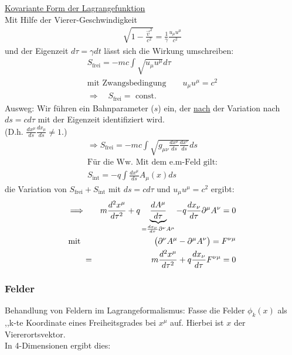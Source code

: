 \underline{Kovariante Form der Lagrangefunktion}\\
Mit Hilfe der Vierer-Geschwindigkeit 
\begin{eqnarray*}
\sqrt{1 - \frac{\vec v^ 2}{c^ 2}} = \frac 1 { \gamma} \frac{u_{\mu} u^ {\mu}}{c^2}
\end{eqnarray*}
und der Eigenzeit $d\tau = \gamma dt$ lässt sich die Wirkung umschreiben:
\begin{eqnarray*}
S_{\text {frei}} = -mc \int \sqrt{u_{\mu}u^ {\mu }} d\tau\\
\text{mit Zwangsbedingung}\qquad u_{\mu}u^ {\mu} = c^ 2\\
\Longrightarrow \quad S_{\text{frei}} = \text{ const.}
\end{eqnarray*}
Ausweg: \babsatz  Wir führen ein Bahnparameter ($s$) ein, der \underline{nach} der Variation nach $ds = cd\tau$ mit der Eigenzeit identifiziert wird.\\
(D.h. $ \frac{dx^ {\mu}}{ds}\frac {dx_{\mu} }{ds} \neq 1$.)\eabsatz
\begin{eqnarray*}
\Longrightarrow S_{\text{frei}} = -mc \int \sqrt{g_{\mu\nu}\frac{dx^ {\mu}}{ds} \frac{dx^{\nu} }{ds} }ds\\
\text{Für die Ww. Mit dem e.m-Feld gilt:}\\
S_{\text{int}} = - q \int \frac{dx^ {\mu}}{ds} A_{\mu}(x) ds
\end{eqnarray*}
die Variation von $S_{\text{frei}} + S_{\text{int}}$ mit $ds = cd\tau$ und $u_{\mu}u^ {\mu} = c^ 2$ ergibt:
\begin{eqnarray*}
\Longrightarrow&{}& m \frac{d^ 2x^ {\mu}}{d\tau^ 2} + q
\underbrace{\frac{dA^ {\mu}}{d\tau}}_{=
  \frac{dx_{\nu}}{d\tau}\partial^ {\nu}A^ {\mu}} - q\frac{dx_{\nu}}{d\tau} \partial^ {\mu} A^ {\nu} = 0\\ 
\text{mit }&{}& \quad \big ( \partial^  {\nu}A^ {\mu} - \partial^ {\mu}A^ {\nu}\big ) = F^ {\nu\mu}\\
&=& m \frac{d^ 2x^ {\mu}}{d\tau^ 2} + q \frac{dx_{\nu}}{d \tau} F^ {\nu\mu} = 0
\end{eqnarray*}
\subsubsection{Felder}
Behandlung von Feldern im Lagrangeformalismus: Fasse die Felder $\phi_k(x)$ als ,,k-te Koordinate eines Freiheitsgrades bei $x^\mu$ auf. Hierbei ist $x$ der Viererortsvektor.\\
In 4-Dimensionen ergibt dies:



